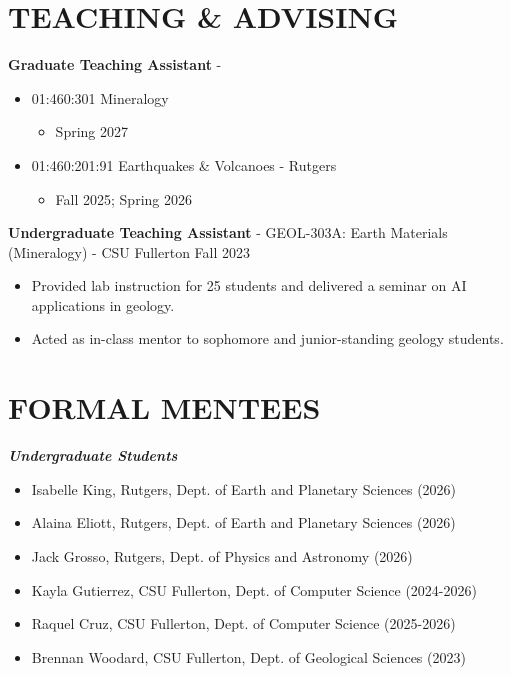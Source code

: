 \documentclass{res} %
\begin{document}
\begin{resume}
\section{\Large{TEACHING \& ADVISING}}
\textbf{Graduate Teaching Assistant} - 
\begin{itemize}
    \item 01:460:301 Mineralogy
    \begin{itemize}
        \item Spring 2027
    \end{itemize}
    \item 01:460:201:91 Earthquakes \& Volcanoes - Rutgers
    \begin{itemize}
        \item Fall 2025; Spring 2026
    \end{itemize}
\end{itemize}

\textbf{Undergraduate Teaching Assistant} - GEOL-303A: Earth Materials (Mineralogy) - CSU Fullerton \hfill Fall 2023
\begin{itemize}
    \item Provided lab instruction for 25 students and delivered a seminar on AI applications in geology. 
    \item Acted as in-class mentor to sophomore and junior-standing geology students. 
\end{itemize}


\section{\Large{FORMAL MENTEES}}

\textit{\textbf{Undergraduate Students}}
\begin{itemize}
  \item Isabelle King, Rutgers, Dept. of Earth and Planetary Sciences (2026)
  \item Alaina Eliott, Rutgers, Dept. of Earth and Planetary Sciences (2026)
  \item Jack Grosso, Rutgers, Dept. of Physics and Astronomy (2026)
  \item Kayla Gutierrez, CSU Fullerton, Dept. of Computer Science (2024-2026)
  \item Raquel Cruz, CSU Fullerton, Dept. of Computer Science (2025-2026)
  \item Brennan Woodard, CSU Fullerton, Dept. of Geological Sciences (2023)


\end{itemize}
\end{resume}
\end{document}
